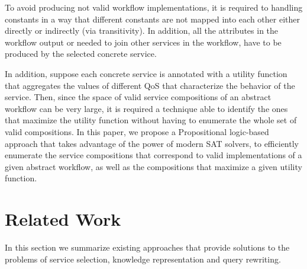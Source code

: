 \documentclass{llncs}
\begin{document}
To avoid producing not valid workflow implementations, it is required to handling constants in a way that different constants are not mapped into
each other either directly or indirectly (via transitivity). In addition,  all the attributes in the workflow output  or needed to join other services in the workflow, have to be produced by the selected concrete service.

In addition, suppose each concrete service is annotated with a utility function that aggregates the values of different QoS that characterize the behavior of the service. Then, since the space of valid service compositions of an abstract workflow can be very large, it is required a technique able to identify the ones that maximize the utility function  without having to enumerate the whole set of valid compositions. In this paper, we propose a Propositional logic-based  approach that takes advantage of the  power of  modern SAT solvers, to efficiently enumerate the service compositions that correspond to valid implementations of a given abstract workflow, as well as the compositions that maximize a given utility function. 

\section{Related Work}
In this section we summarize existing approaches that provide solutions to the problems of service selection, knowledge representation and query rewriting. 
\end{document}
